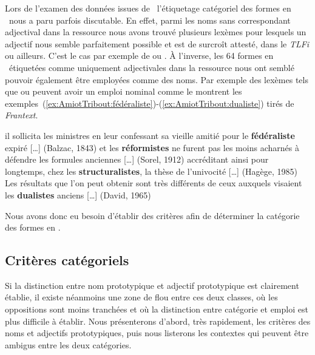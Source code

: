 \documentclass[output=paper]{LSP/langsci}
\begin{document}
Lors de l'examen des données issues de \lexiq\ l'étiquetage catégoriel des formes en \iste\ nous a paru parfois discutable. En effet, parmi les noms sans correspondant adjectival dans la ressource nous avons trouvé plusieurs lexèmes pour lesquels un  adjectif nous semble parfaitement possible et est de surcroît attesté, dans le \textit{TLFi} ou ailleurs. C'est le cas par exemple de  ou . À l'inverse, les 64 formes en \iste\ étiquetées comme uniquement adjectivales dans la ressource nous ont semblé pouvoir  également être employées comme des noms. Par exemple des lexèmes tels que  ou  peuvent avoir un emploi nominal comme le montrent les exemples~(\ref{ex:AmiotTribout:fédéraliste})-(\ref{ex:AmiotTribout:dualiste}) tirés de \textit{Frantext}.

\begin{exe}
\ex \label{ex:AmiotTribout:fédéraliste} il sollicita les ministres en leur confessant sa vieille amitié pour le \textbf{fédéraliste} expiré [\ldots] (Balzac, 1843)
\ex et les \textbf{réformistes} ne furent pas les moins acharnés à défendre les formules anciennes [\ldots] (Sorel, 1912)
\ex accréditant ainsi pour longtemps, chez les \textbf{structuralistes}, la thèse de l'uni\-vocité [\ldots] (Hagège, 1985)
\ex \label{ex:AmiotTribout:dualiste} Les résultats que l'on peut obtenir sont très différents de ceux auxquels visaient les \textbf{dualistes} anciens [\ldots]
(David, 1965)

\end{exe}

Nous avons donc eu besoin d'établir des critères afin de déterminer la catégorie des formes en \iste.



\subsection{Critères catégoriels}\label{section:AmiotTribout:criteres-cat}
Si la distinction entre nom prototypique et adjectif prototypique  est clairement établie, il existe néanmoins une zone de flou entre ces deux classes, où les oppositions sont moins tranchées et où la distinction entre catégorie et emploi est plus difficile à établir. Nous présenterons d'abord, très rapidement, les critères des noms et adjectifs prototypiques, puis nous listerons les contextes qui peuvent être ambigus entre les deux catégories.
\end{document}
